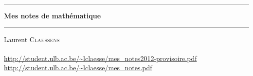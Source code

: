 
\thispagestyle{empty}
\begin{center}
  \begin{minipage}{15cm}
    \hrule\par
    \vspace{2mm}
    \begin{center}
    \Huge \bfseries Mes notes de mathématique \par
    \end{center}
    \hrule\par
  \end{minipage}
\end{center}

\vspace{2cm}

\begin{center}
    Laurent \textsc{Claessens}\\
    \\
    \url{http://student.ulb.ac.be/~lclaesse/mes_notes2012-provisoire.pdf}\\
    \url{http://student.ulb.ac.be/~lclaesse/mes_notes.pdf}
\end{center}

\vfill

